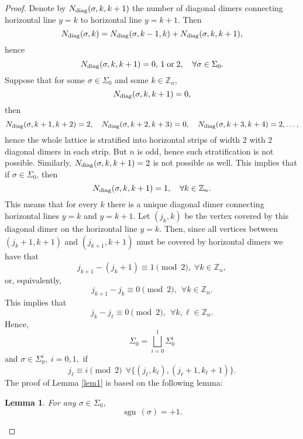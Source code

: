 \documentclass[12pt,reqno]{amsart}
\numberwithin{equation}{section}
\newcommand{\Z}{{\mathbb Z}}
\newcommand{\sg}{\sigma}
\newcommand{\Sg}{\Sigma}
\newcommand{\sgn}{{\operatorname{sgn}\,}}
\newtheorem{lem}[theo]{{\sc \bf Lemma}}
\begin{document}
\begin{proof}
Denote by $N_{\rm diag}(\sg,k,k+1)$ the number of diagonal dimers connecting horizontal line $y=k$ to horizontal line $y=k+1$. Then 
\[
N_{\rm diag}(\sg,k)=N_{\rm diag}(\sg,k-1,k)+N_{\rm diag}(\sg,k,k+1),
\]
hence
\[
N_{\rm diag}(\sg,k,k+1)=0,\, 1 \;\textrm{or}\; 2,\quad \forall \sg\in\Sg_0. 
\]
Suppose that for some $\sg\in\Sg_0$ and some $k\in \Z_n$,
\[
N_{\rm diag}(\sg,k,k+1)= 0, 
\]
then
\[
N_{\rm diag}(\sg,k+1,k+2)= 2, \quad N_{\rm diag}(\sg,k+2,k+3)= 0, \quad
N_{\rm diag}(\sg,k+3,k+4)= 2, \ldots,
\]
hence the whole lattice is stratified into horizontal strips of width 2 with 2 diagonal dimers in each strip. But $n$ is odd, hence such stratification is not possible. Similarly, $N_{\rm diag}(\sigma,k,k+1) = 2$ is not possible as well. This implies that if $\sg\in\Sg_0$, then
\[
N_{\rm diag}(\sg,k,k+1)= 1,\quad \forall k\in\Z_n.  
\]
This means that for every $k$ there is a unique diagonal dimer connecting horizontal lines $y=k$ and $y=k+1$. Let $(j_k,k)$ be the vertex covered by this diagonal dimer
on the horizontal line $y=k$.
Then, since all vertices between $(j_{k}+1,k+1)$  and $(j_{k+1},k+1)$ must be covered by horizontal dimers we have that 
\begin{equation}\label{pos4a}
j_{k+1}-(j_k+1)\equiv 1\pmod 2, \;\forall k\in\Z_n,
\end{equation}
or, equivalently,
\begin{equation}\label{pos4}
j_{k+1}-j_k\equiv 0\pmod 2, \;\,\forall k\in\Z_n.
\end{equation}
This implies that 
\begin{equation}\label{pos4ab}
j_k-j_{\ell}\equiv 0 \pmod 2, \;\,\forall k,\ell\in\Z_n.
\end{equation}
Hence, 
\begin{equation}\label{pos4b}
\Sigma_{0}=\bigsqcup_{i=0}^{1}\Sigma_{0}^{i}
\end{equation}
and $\sg\in\Sigma_{0}^{i},\; i=0,1,$ if
\begin{equation}\label{pos4c}
j_\ell\equiv i \pmod 2\;\,\forall \{(j_\ell,k_\ell),(j_\ell+1, k_\ell+1)\}.
\end{equation}
The proof of Lemma \ref{lem1} is based on the following lemma:

\begin{lem} \label{lem2} For any $\sg\in\Sigma_0$,
\begin{equation}\label{pos5}
\sgn(\sg)=+1.
\end{equation} 
\end{lem}


\end{proof}
\end{document}
